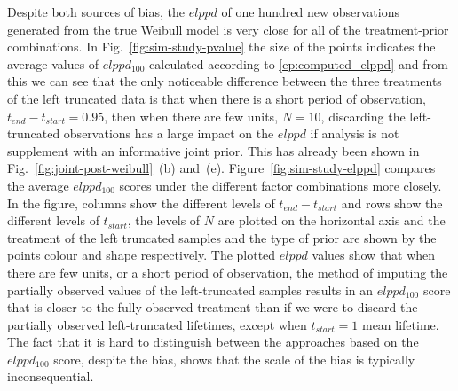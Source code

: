 Despite both sources of bias, the $elppd$ of one hundred new observations generated from the true Weibull model is very close for all of the treatment-prior combinations. In Fig.~\ref{fig:sim-study-pvalue} the size of the points indicates the average values of $elppd_{100}$ calculated according to \eqref{ep:computed_elppd} and from this we can see that the only noticeable difference between the three treatments of the left truncated data is that when there is a short period of observation,  $t_{end} - t_{start} = 0.95$, then when there are few units, $N = 10$, discarding the left-truncated observations has a large impact on the $elppd$ if analysis is not supplement with an informative joint prior. This has already been shown in Fig.~\ref{fig:joint-post-weibull}~(b) and~(e). Figure~\ref{fig:sim-study-elppd} compares the average $elppd_{100}$ scores under the different factor combinations more closely. In the figure, columns show the different levels of $t_{end} - t_{start}$ and rows show the different levels of $t_{start}$, the levels of $N$ are plotted on the horizontal axis and the treatment of the left truncated samples and the type of prior are shown by the points colour and shape respectively. The plotted $elppd$ values show that when there are few units, or a short period of observation, the method of imputing the partially observed values of the left-truncated samples results in an $elppd_{100}$ score that is closer to the fully observed treatment than if we were to discard the partially observed left-truncated lifetimes, except when $t_{start} = 1$ mean lifetime. The fact that it is hard to distinguish between the approaches based on the $elppd_{100}$ score, despite the bias, shows that the scale of the bias is typically inconsequential.

